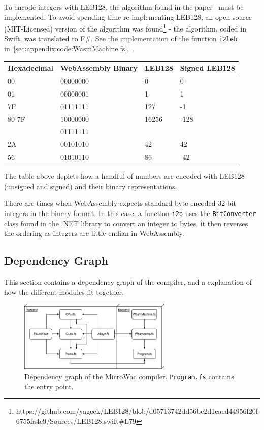 \documentclass[a4paper]{article}
\begin{document}
To encode integers with LEB128, the algorithm found in the paper~\cite{DWARF} must be implemented. To avoid spending time re-implementing LEB128, an open source (MIT-Licensed) version of the algorithm was found\footnote{https://github.com/yageek/LEB128/blob/d05713742dd56bc2d1eaed44956f20f6755fa4e9/Sources/LEB128.swift\#L79} - the algorithm, coded in Swift, was translated to F\#. See the implementation of the function \texttt{i2leb} in~\ref{sec:appendix:code:WasmMachine.fs},~.

\begin{center}
    \begin{tabular}{| l | l | l | l |}
    \hline
    Hexadecimal & WebAssembly Binary & LEB128 & Signed LEB128 \\ \hline
    00    & 00000000 &     0 &    0 \\ \hline
    01    & 00000001 &     1 &    1 \\ \hline
    7F    & 01111111 &   127 &   -1 \\ \hline
    80 7F & 10000000 & 16256 & -128 \\
          & 01111111 & &            \\ \hline
    2A    & 00101010 &    42 &   42 \\ \hline
    56    & 01010110 &    86 &  -42 \\ \hline
    \end{tabular}
\end{center}

The table above depicts how a handful of numbers are encoded with LEB128 (unsigned and signed) and their binary representations.

There are times when WebAssembly expects standard byte-encoded 32-bit integers in the binary format. In this case, a function \texttt{i2b} uses the \texttt{BitConverter} class found in the .NET library to convert an integer to bytes, it then reverses the ordering as integers are little endian in WebAssembly.

\subsection{Dependency Graph}
\label{sec:technical:dependency-graph}
This section contains a dependency graph of the compiler, and a explanation of how the different modules fit together.

\begin{figure}[H]
	\includegraphics[width=0.65\textwidth]{DependencyGraph}
	\centering
	\caption{Dependency graph of the MicroWac compiler. \texttt{Program.fs} contains the entry point.}
\end{figure}
\end{document}
